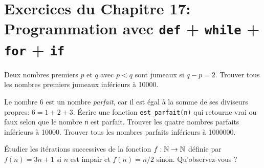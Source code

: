 \section*{Exercices du Chapitre 17: Programmation avec \texttt{def} + \texttt{while} +
\texttt{for} + \texttt{if}}

\begin{question}
Deux nombres premiers $p$ et $q$ avec $p<q$ sont jumeaux si $q-p=2$. Trouver
tous les nombres premiers jumeaux inférieurs à 10000.
\end{question}

\begin{question}
Le nombre 6 est un nombre \emph{parfait}, car il est égal à la somme de ses
diviseurs propres: $6=1+2+3$. Écrire une fonction \texttt{est\_parfait(n)} qui
retourne vrai ou faux selon que le nombre \texttt{n} est parfait.
Trouver les quatre nombres parfaits inférieurs à 10000. Trouver tous les nombres
parfaits inférieurs à 1000000.
\end{question}






\begin{question}
Étudier les itérations successives de la fonction $f : \mathbb{N} \rightarrow \mathbb{N}$ définie par
$f(n) = 3n+1$ si $n$ est impair
et $f(n) = n/2$ sinon.
Qu'observez-vous ?
\end{question}



